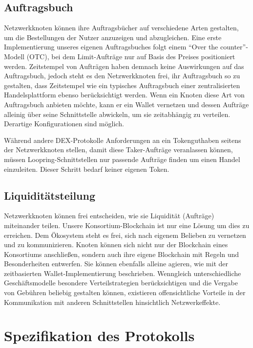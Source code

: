 \documentclass[UTF8,nofonts]{article}
\begin{document}
\begin{multicols}{2}
\subsection{Auftragsbuch\label{sec:order_book}}
Netzwerkknoten können ihre Auftragsbücher auf verschiedene Arten gestalten, um die Bestellungen der Nutzer anzuzeigen und abzugleichen. Eine erste Implementierung unseres eigenen Auftragsbuches folgt einem \enquote{Over the counter}-Modell (OTC), bei dem Limit-Aufträge nur auf Basis des Preises positioniert werden. Zeitstempel von Aufträgen haben demnach keine Auswirkungen auf das Auftragsbuch, jedoch steht es den Netzwerkknoten frei, ihr Auftragsbuch so zu gestalten, dass Zeitstempel wie ein typisches Auftragsbuch einer zentralisierten Handelsplattform ebenso berücksichtigt werden. Wenn ein Knoten diese Art von Auftragsbuch anbieten möchte, kann er ein Wallet vernetzen und dessen Aufträge alleinig über seine Schnittstelle abwickeln, um sie zeitabhängig zu verteilen. Derartige Konfigurationen sind möglich.

Während andere DEX-Protokolle Anforderungen an ein Tokenguthaben seitens der Netzwerkknoten stellen, damit diese Taker-Aufträge veranlassen können, müssen Loopring-Schnittstellen nur passende Aufträge finden um einen Handel einzuleiten. Dieser Schritt bedarf keiner eigenen Token.

\subsection{Liquiditätsteilung\label{sec:liquidity_sharing}}
Netzwerkknoten können frei entscheiden, wie sie Liquidität (Aufträge) miteinander teilen. Unsere Konsortium-Blockchain ist nur eine Lösung um dies zu erreichen. Dem Ökosystem steht es frei, sich nach eigenem Belieben zu vernetzen und zu kommunizieren. Knoten können sich nicht nur der Blockchain eines Konsortiums anschließen, sondern auch ihre eigene Blockchain mit Regeln und Besonderheiten entwerfen. Sie können ebenfalls alleine agieren, wie mit der zeitbasierten Wallet-Implementierung beschrieben. Wenngleich unterschiedliche Geschäftsmodelle besondere Verteilstrategien berücksichtigen und die Vergabe von Gebühren beliebig gestalten können, existieren offensichtliche Vorteile in der Kommunikation mit anderen Schnittstellen hinsichtlich Netzwerkeffekte.

\section{Spezifikation des Protokolls\label{sec:protocol}}


\end{multicols}
\end{document}
